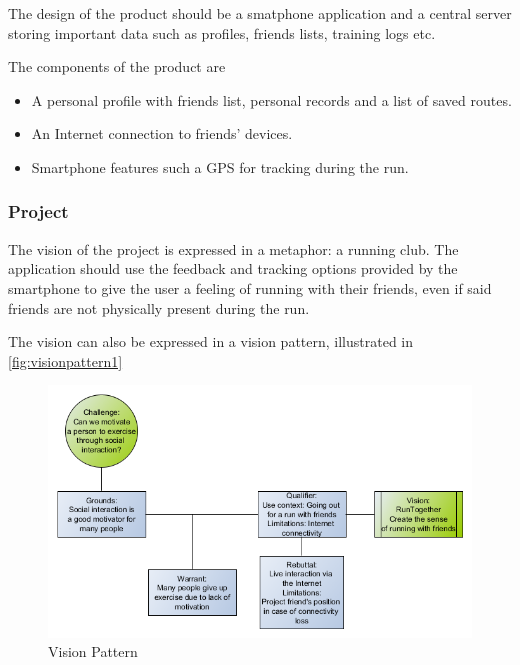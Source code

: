 The design of the product should be a smatphone application and a central server storing important data such as profiles, friends lists, training logs etc.
\vspace{10pt}

The components of the product are
\begin{itemize}
\item A personal profile with friends list, personal records and a list of saved routes.
\item An Internet connection to friends' devices.
\item Smartphone features such a \ac{GPS} for tracking during the run.
\end{itemize}

\subsubsection{Project}
The vision of the project is expressed in a metaphor: a running club. The application should use the feedback and tracking options provided by the smartphone to give the user a feeling of running with their friends, even if said friends are not physically present during the run. 
\vspace{10pt}

The vision can also be expressed in a vision pattern, illustrated in \autoref{fig:visionpattern1}

\begin{figure}[ht]
\begin{center}
 \caption{Vision Pattern}
 \label{fig:visionpattern1}
 \includegraphics[scale=0.5]{img/visionpattern1.png}
\end{center}
\end{figure}
\vspace{10pt}

